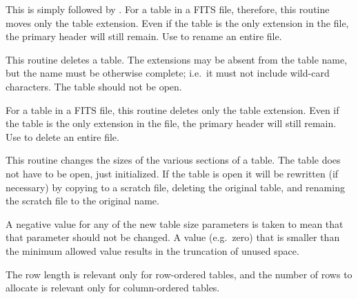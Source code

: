 This is simply  followed by .
For a table in a FITS file, therefore,
this routine moves only the table extension.
Even if the table is the only extension in the file,
the primary header will still remain.
Use  to rename an entire file.

\callseqtable

\begin{callseq}
\end{callseq}

This routine deletes a table.
The extensions may be absent from the table name,
but the name must be otherwise complete;
i.e.~it must not include wild-card characters.
The table should not be open.

For a table in a FITS file,
this routine deletes only the table extension.
Even if the table is the only extension in the file,
the primary header will still remain.
Use  to delete an entire file.

\callseqtable

\begin{callseq}
\end{callseq}

This routine changes the sizes of the various sections of a table.
The table does not have to be open, just initialized.
If the table is open it will be rewritten (if necessary) by copying
to a scratch file, deleting the original table,
and renaming the scratch file to the original name.

A negative value for any of the new table size parameters is taken to
mean that that parameter should not be changed.
A value (e.g.~zero) that is smaller than the minimum allowed value
results in the truncation of unused space.

The row length is relevant only for row-ordered tables, and the
number of rows to allocate is relevant only for column-ordered tables.

\callseqtable


